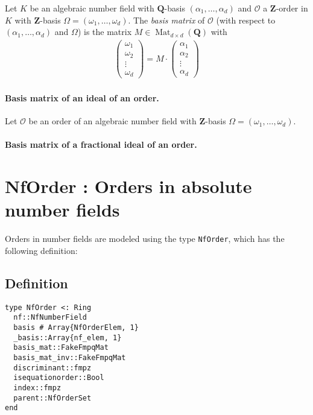 \documentclass[a4paper,10pt]{article}
\newcommand{\Z}{\mathbf{Z}}
\newcommand{\Q}{\mathbf{Q}}
\newcommand{\code}{\lstinline}
\newcommand{\Mat}{\operatorname{Mat}}
\begin{document}
Let $K$ be an algebraic number field with $\Q$-basis $(\alpha_1,\dotsc,\alpha_d)$ and $\mathcal O$ a $\Z$-order in $K$ with $\Z$-basis $\Omega = (\omega_1,\dotsc,\omega_d)$.
The \textit{basis matrix} of $\mathcal O$ (with respect to $(\alpha_1,\dotsc,\alpha_d)$ and $\Omega$) is the matrix $M \in \Mat_{d \times d}(\Q)$ with
\begin{align*}
  \begin{pmatrix} \omega_1 \\ \omega_2 \\ \vdots \\ \omega_d \end{pmatrix} =
  M \cdot \begin{pmatrix} \alpha_1 \\ \alpha_2 \\ \vdots \\ \alpha_d \end{pmatrix}
\end{align*}

\paragraph{Basis matrix of an ideal of an order.}

Let $\mathcal O$ be an order of an algebraic number field with $\Z$-basis $\Omega = (\omega_1,\dotsc,\omega_d)$.

\paragraph{Basis matrix of a fractional ideal of an order.}

\section{NfOrder : Orders in absolute number fields}

Orders in number fields are modeled using the type \code{NfOrder}, which has the following definition:

\subsection{Definition}

\begin{lstlisting}
type NfOrder <: Ring             
  nf::NfNumberField              
  basis # Array{NfOrderElem, 1}  
  _basis::Array{nf_elem, 1}      
  basis_mat::FakeFmpqMat         
  basis_mat_inv::FakeFmpqMat     
  discriminant::fmpz             
  isequationorder::Bool          
  index::fmpz                
  parent::NfOrderSet 
end
\end{lstlisting}
\end{document}
